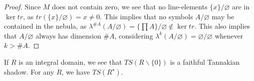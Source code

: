 \begin{proof}
  Since $M$ does not contain zero, we see that no line-elements $\{x\}/\varnothing$ are in $\ker tr$, as $tr(\{x\}/\varnothing) = x \ne 0$. This implies that no symbols $A/\varnothing$ may be contained in the nebula, as $\lambda^{\#A}(A/\varnothing) = \{\prod A\}/\varnothing \notin \ker tr$. This also implies that $A/\varnothing$ always has dimension $\#A$, considering $\lambda^k(A/\varnothing) = \varnothing/\varnothing$ whenever $k > \#A$.
  
  
\end{proof}

\begin{example}
  If $R$ is an integral domain, we see that $TS(R \backslash \{0\})$ is a faithful Tannakian shadow. For any $R$, we have $TS(R^{\star})$.
\end{example}
